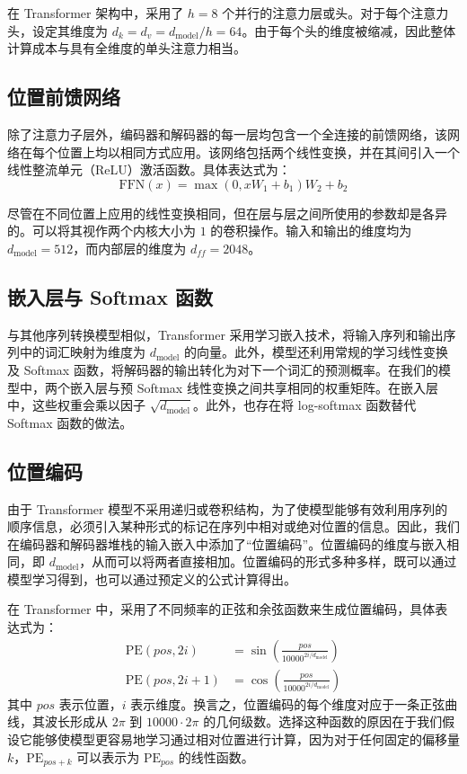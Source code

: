 在 Transformer 架构中，采用了 \(h = 8\) 个并行的注意力层或头。对于每个注意力头，设定其维度为 \(d_k = d_v = d_{\text{model}} / h = 64\)。由于每个头的维度被缩减，因此整体计算成本与具有全维度的单头注意力相当。

\subsection{位置前馈网络}

除了注意力子层外，编码器和解码器的每一层均包含一个全连接的前馈网络，该网络在每个位置上均以相同方式应用。该网络包括两个线性变换，并在其间引入一个线性整流单元（ReLU）激活函数。具体表达式为：
\begin{equation}
\text{FFN}(x) = \max(0, xW_1 + b_1)W_2 + b_2
\label{eq3.4}
\end{equation}

尽管在不同位置上应用的线性变换相同，但在层与层之间所使用的参数却是各异的。可以将其视作两个内核大小为 \(1\) 的卷积操作。输入和输出的维度均为 \(d_{\text{model}} = 512\)，而内部层的维度为 \(d_{ff} = 2048\)。

\subsection{嵌入层与 Softmax 函数}

与其他序列转换模型相似，Transformer 采用学习嵌入技术，将输入序列和输出序列中的词汇映射为维度为 \(d_{\text{model}}\) 的向量。此外，模型还利用常规的学习线性变换及 Softmax 函数，将解码器的输出转化为对下一个词汇的预测概率。在我们的模型中，两个嵌入层与预 Softmax 线性变换之间共享相同的权重矩阵。在嵌入层中，这些权重会乘以因子 \(\sqrt{d_{\text{model}}}\)。此外，也存在将 log-softmax 函数替代 Softmax 函数的做法。

\subsection{位置编码}

由于 Transformer 模型不采用递归或卷积结构，为了使模型能够有效利用序列的顺序信息，必须引入某种形式的标记在序列中相对或绝对位置的信息。因此，我们在编码器和解码器堆栈的输入嵌入中添加了“位置编码”。位置编码的维度与嵌入相同，即 \(d_{\text{model}}\)，从而可以将两者直接相加。位置编码的形式多种多样，既可以通过模型学习得到，也可以通过预定义的公式计算得出。

在 Transformer 中，采用了不同频率的正弦和余弦函数来生成位置编码，具体表达式为：
\begin{equation}
\begin{aligned}
\text{PE}(pos,2i) &= \sin \left ( \frac{pos}{10000^{2i/d_{\text{model}}}} \right ) \\
\text{PE}(pos,2i+1) &= \cos \left ( \frac{pos}{10000^{2i/d_{\text{model}}}} \right )
\end{aligned}
\label{eq3.5}
\end{equation}
其中 \(pos\) 表示位置，\(i\) 表示维度。换言之，位置编码的每个维度对应于一条正弦曲线，其波长形成从 \(2\pi\) 到 \(10000 \cdot 2\pi\) 的几何级数。选择这种函数的原因在于我们假设它能够使模型更容易地学习通过相对位置进行计算，因为对于任何固定的偏移量 \(k\)，\(\text{PE}_{pos+k}\) 可以表示为 \(\text{PE}_{pos}\) 的线性函数。

